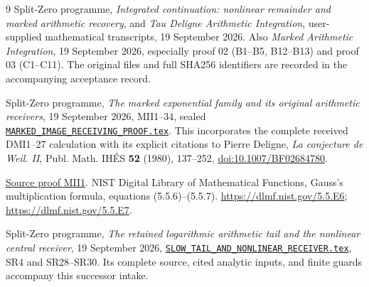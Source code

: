 \documentclass[11pt]{article}
\begin{document}
\begin{thebibliography}{9}
Split-Zero programme, \emph{Integrated continuation: nonlinear
remainder and marked arithmetic recovery}, and \emph{Tau Deligne
Arithmetic Integration}, user-supplied mathematical transcripts,
19 September 2026. Also \emph{Marked Arithmetic Integration},
19 September 2026, especially proof 02 (B1--B5, B12--B13) and
proof 03 (C1--C11). The original files and full SHA256 identifiers
are recorded in the accompanying acceptance record.

Split-Zero programme, \emph{The marked exponential family and its
original arithmetic receivers}, 19 September 2026, MII1--34,
sealed \href{https://github.com/KokunoYumeto/zeta-function-research-reader/blob/487253b5b01851da5b9b98af4e146fecf1fab902/workbenches/splitzero-tandem/continuations/20260919-arithmetic-signs-marked-classes/first_intake/marked_image/MARKED_IMAGE_RECEIVING_PROOF.tex\#L1}{\texttt{MARKED\_IMAGE\_RECEIVING\_PROOF.tex}}.
This incorporates the complete received DMI1--27 calculation
with its explicit citations to Pierre Deligne, \emph{La conjecture
de Weil. II}, Publ. Math. IH\'ES \textbf{52} (1980), 137--252,
\href{https://doi.org/10.1007/BF02684780}{doi:10.1007/BF02684780}.


\href{https://github.com/KokunoYumeto/zeta-function-research-reader/blob/487253b5b01851da5b9b98af4e146fecf1fab902/workbenches/splitzero-tandem/continuations/20260919-arithmetic-signs-marked-classes/first_intake/marked_image/MARKED_IMAGE_RECEIVING_PROOF.tex\#L44}{Source proof MII1}.
NIST Digital Library of Mathematical Functions,
Gauss's multiplication formula, equations (5.5.6)--(5.5.7).
\url{https://dlmf.nist.gov/5.5.E6};
\url{https://dlmf.nist.gov/5.5.E7}.

Split-Zero programme, \emph{The retained logarithmic arithmetic tail
and the nonlinear central receiver}, 19 September 2026,
\href{https://github.com/KokunoYumeto/zeta-function-research-reader/blob/487253b5b01851da5b9b98af4e146fecf1fab902/workbenches/splitzero-tandem/continuations/20260919-arithmetic-signs-marked-classes/arrival_02/signed_refinement/SLOW_TAIL_AND_NONLINEAR_RECEIVER.tex\#L1}{\texttt{SLOW\_TAIL\_AND\_NONLINEAR\_RECEIVER.tex}},
SR4 and SR28--SR30. Its complete source, cited analytic inputs,
and finite guards accompany this successor intake.



\end{thebibliography}
\end{document}
